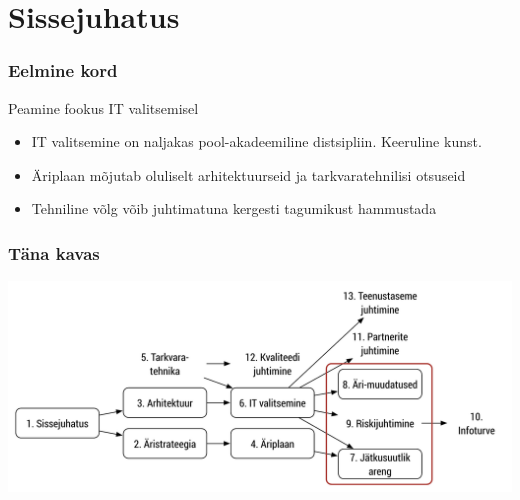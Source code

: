 

\maketitle

\section{Sissejuhatus}
\begin{frame}[fragile]
  \frametitle{Eelmine kord}
  Peamine fookus IT valitsemisel
	\begin{itemize}
		\item IT valitsemine on naljakas pool-akadeemiline distsipliin. Keeruline kunst.
		\item Äriplaan mõjutab oluliselt arhitektuurseid ja tarkvaratehnilisi otsuseid
		\item Tehniline võlg võib juhtimatuna kergesti tagumikust hammustada
	\end{itemize}
\end{frame}

\begin{frame}[fragile]
  \frametitle{Täna kavas}
		\includegraphics[width=\textwidth]{aine_struktuur_kolmas.pdf}
\end{frame}

